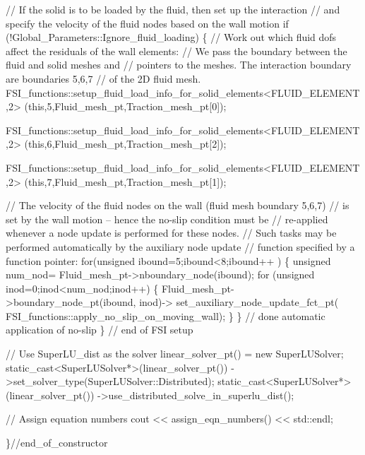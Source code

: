 \begin{DoxyCodeInclude}
 \textcolor{comment}{// If the solid is to be loaded by the fluid, then set up the interaction}
 \textcolor{comment}{// and specify the velocity of the fluid nodes based on the wall motion}
 \textcolor{keywordflow}{if} (!Global\_Parameters::Ignore\_fluid\_loading)
  \{
   \textcolor{comment}{// Work out which fluid dofs affect the residuals of the wall elements:}
   \textcolor{comment}{// We pass the boundary between the fluid and solid meshes and }
   \textcolor{comment}{// pointers to the meshes. The interaction boundary are boundaries 5,6,7}
   \textcolor{comment}{// of the 2D fluid mesh.}
   FSI\_functions::setup\_fluid\_load\_info\_for\_solid\_elements<FLUID\_ELEMENT,2>
    (\textcolor{keyword}{this},5,Fluid\_mesh\_pt,Traction\_mesh\_pt[0]);
   
   FSI\_functions::setup\_fluid\_load\_info\_for\_solid\_elements<FLUID\_ELEMENT,2>
    (\textcolor{keyword}{this},6,Fluid\_mesh\_pt,Traction\_mesh\_pt[2]);

   FSI\_functions::setup\_fluid\_load\_info\_for\_solid\_elements<FLUID\_ELEMENT,2>
    (\textcolor{keyword}{this},7,Fluid\_mesh\_pt,Traction\_mesh\_pt[1]); 

   \textcolor{comment}{// The velocity of the fluid nodes on the wall (fluid mesh boundary 5,6,7)}
   \textcolor{comment}{// is set by the wall motion -- hence the no-slip condition must be}
   \textcolor{comment}{// re-applied whenever a node update is performed for these nodes. }
   \textcolor{comment}{// Such tasks may be performed automatically by the auxiliary node update }
   \textcolor{comment}{// function specified by a function pointer:}
   \textcolor{keywordflow}{for}(\textcolor{keywordtype}{unsigned} ibound=5;ibound<8;ibound++ )
    \{ 
     \textcolor{keywordtype}{unsigned} num\_nod= Fluid\_mesh\_pt->nboundary\_node(ibound);
     \textcolor{keywordflow}{for} (\textcolor{keywordtype}{unsigned} inod=0;inod<num\_nod;inod++)
      \{   
       Fluid\_mesh\_pt->boundary\_node\_pt(ibound, inod)->
        set\_auxiliary\_node\_update\_fct\_pt(
         FSI\_functions::apply\_no\_slip\_on\_moving\_wall);
      \}
    \} \textcolor{comment}{// done automatic application of no-slip}
  \} \textcolor{comment}{// end of FSI setup}

 \textcolor{comment}{// Use SuperLU\_dist as the solver}
 linear\_solver\_pt() = \textcolor{keyword}{new} SuperLUSolver;
 \textcolor{keyword}{static\_cast<}SuperLUSolver*\textcolor{keyword}{>}(linear\_solver\_pt())
  ->set\_solver\_type(SuperLUSolver::Distributed);
 \textcolor{keyword}{static\_cast<}SuperLUSolver*\textcolor{keyword}{>}(linear\_solver\_pt())
  ->use\_distributed\_solve\_in\_superlu\_dist();

 \textcolor{comment}{// Assign equation numbers}
 cout << assign\_eqn\_numbers() << std::endl; 

\}\textcolor{comment}{//end\_of\_constructor}

\end{DoxyCodeInclude}


